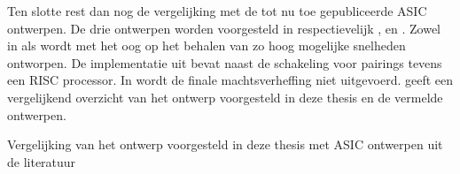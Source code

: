 Ten slotte rest dan nog de vergelijking met de tot nu toe gepubliceerde ASIC ontwerpen. De drie ontwerpen worden voorgesteld in respectievelijk \cite{beuchat-asic}, \cite{kammler} en \cite{savas}. Zowel in \cite{beuchat-asic} als \cite{savas} wordt met het oog op het behalen van zo hoog mogelijke snelheden ontworpen. De implementatie uit \cite{kammler} bevat naast de schakeling voor pairings tevens een RISC processor. In \cite{savas} wordt de finale machtsverheffing niet uitgevoerd.  geeft een vergelijkend overzicht van het ontwerp voorgesteld in deze thesis en de vermelde ontwerpen.

\begin{table}[h]
	\caption{Vergelijking van het ontwerp voorgesteld in deze thesis met ASIC ontwerpen uit de literatuur}
	\label{tabel-resultaten-asic}


\end{table}
